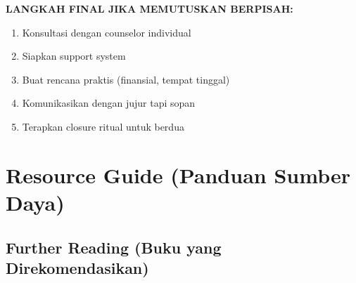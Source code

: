 \begin{warningbox}
\textbf{LANGKAH FINAL JIKA MEMUTUSKAN BERPISAH:}
\begin{enumerate}[itemsep=0.15cm]
    \item[$\square$] Konsultasi dengan counselor individual
    \item[$\square$] Siapkan support system
    \item[$\square$] Buat rencana praktis (finansial, tempat tinggal)
    \item[$\square$] Komunikasikan dengan jujur tapi sopan
    \item[$\square$] Terapkan closure ritual untuk berdua
\end{enumerate}
\end{warningbox}

\section{Resource Guide (Panduan Sumber Daya)}

\subsection{Further Reading (Buku yang Direkomendasikan)}


